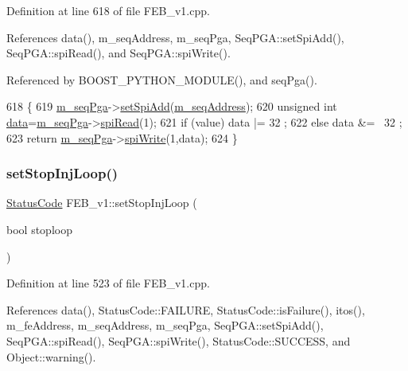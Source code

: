 Definition at line 618 of file F\+E\+B\+\_\+v1.\+cpp.



References data(), m\+\_\+seq\+Address, m\+\_\+seq\+Pga, Seq\+P\+G\+A\+::set\+Spi\+Add(), Seq\+P\+G\+A\+::spi\+Read(), and Seq\+P\+G\+A\+::spi\+Write().



Referenced by B\+O\+O\+S\+T\+\_\+\+P\+Y\+T\+H\+O\+N\+\_\+\+M\+O\+D\+U\+L\+E(), and seq\+Pga().


\begin{DoxyCode}
618                                             \{
619   \hyperlink{classFEB__v1_a6c7804ac86796f233a8393043adf2e77}{m\_seqPga}->\hyperlink{classSeqPGA_ac998ce3a6d9b5f2e88cc8393f8c1df53}{setSpiAdd}(\hyperlink{classFEB__v1_a1c1eb093fd1733b9510fcf8bc5c7ad08}{m\_seqAddress});
620   \textcolor{keywordtype}{unsigned} \textcolor{keywordtype}{int} \hyperlink{classFEB__v1_a6bca4320bd3bbbc32efc81097f33421a}{data}=\hyperlink{classFEB__v1_a6c7804ac86796f233a8393043adf2e77}{m\_seqPga}->\hyperlink{classSeqPGA_ab3d0e5e5d4014bc7a92588a76b8713d4}{spiRead}(1);
621   \textcolor{keywordflow}{if} (value)  data |= 32  ;
622   \textcolor{keywordflow}{else}        data &= ~32 ;
623   \textcolor{keywordflow}{return} \hyperlink{classFEB__v1_a6c7804ac86796f233a8393043adf2e77}{m\_seqPga}->\hyperlink{classSeqPGA_ad4421841ce4ce8b88ad13f63216f0743}{spiWrite}(1,data);
624 \}
\end{DoxyCode}
\mbox{\label{classFEB__v1_aaf8386be3d27ea22e389b0a6c7699af7}} 
\subsubsection{\texorpdfstring{set\+Stop\+Inj\+Loop()}{setStopInjLoop()}}
{\footnotesize\ttfamily \hyperlink{classStatusCode}{Status\+Code} F\+E\+B\+\_\+v1\+::set\+Stop\+Inj\+Loop (\begin{DoxyParamCaption}\item[{bool}]{stoploop }\end{DoxyParamCaption})}



Definition at line 523 of file F\+E\+B\+\_\+v1.\+cpp.



References data(), Status\+Code\+::\+F\+A\+I\+L\+U\+RE, Status\+Code\+::is\+Failure(), itos(), m\+\_\+fe\+Address, m\+\_\+seq\+Address, m\+\_\+seq\+Pga, Seq\+P\+G\+A\+::set\+Spi\+Add(), Seq\+P\+G\+A\+::spi\+Read(), Seq\+P\+G\+A\+::spi\+Write(), Status\+Code\+::\+S\+U\+C\+C\+E\+SS, and Object\+::warning().



